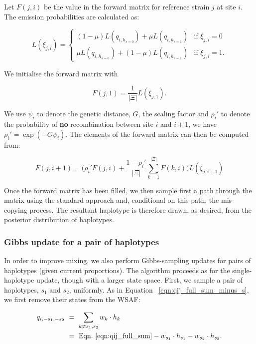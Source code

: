 \documentclass{article}
\begin{document}
Let $F(j,i)$ be the value in the forward matrix for reference strain $j$ at site $i$.  The emission probabilities are calculated as:

\begin{equation}
L(\xi_{j,i}) =
\begin{cases}
(1-\mu) L(q_{i,h_{s=0}})+\mu L(q_{i,h_{s=1}}) & \text{if $\xi_{j,i}=0$}\\
\mu L(q_{i,h_{s=0}})+(1-\mu) L(q_{i,h_{s=1}}) & \text{if $\xi_{j,i}=1$}.
\end{cases}
\label{eqn:emiss_1hap}
\end{equation}

\noindent We initialise the forward matrix with

\begin{equation}
F(j,1)=\frac{1}{|\Xi|}L(\xi_{j,1}).
\end{equation}

\noindent We use $\psi_i$ to denote the genetic distance, $G$, the scaling factor and $\rho_i'$ to denote the probability of \textbf{no} recombination between site $i$ and $i+1$, we have $\rho_i' = \exp(-G \psi_i)$.  The elements of the forward matrix can then be computed from:

\begin{equation}
F(j,i+1)=\big(\rho_i' F(j,i) + \frac{1-\rho_i'}{|\Xi|}\sum_{k=1}^{|\Xi|}F(k,i)\big) L(\xi_{j,i+1})
\end{equation}


Once the forward matrix has been filled, we then sample first a path through the matrix using the standard approach and, conditional on this path, the mis-copying process.  The resultant haplotype is therefore drawn, as desired, from the posterior distribution of haplotypes.



\subsubsection{Gibbs update for a pair of haplotypes}\label{sec:deconvolute}

In order to improve mixing, we also perform Gibbs-sampling updates for pairs of haplotypes (given current proportions). The algorithm proceeds as for the single-haplotype update, though with a larger state space.  First, we sample a pair of haplotypes, $s_1$ and $s_2$, uniformly. As in Equation ~\eqref{eqn:qij_full_sum_minus_s}, we first remove their states from the WSAF:

\begin{equation}
\begin{split}
q_{i,-s_1, -s_2} & ~ = ~ \sum_{k\neq s_1,s_2} w_k \cdot h_k \\
                 & ~ = ~ \textrm{Eqn.~\eqref{eqn:qij_full_sum}} - w_{s_1} \cdot h_{s_1} - w_{s_2} \cdot h_{s_2}.
\label{eqn:qij_full_sum_minus_s1_s2}
\end{split}
\end{equation}
\end{document}
